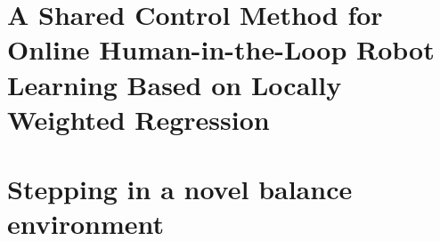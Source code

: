 \documentclass[12pt,a4paper,twoside]{report}
\begin{document}
\chapter{A Shared Control Method for Online Human-in-the-Loop Robot Learning Based on Locally Weighted Regression}\label{sec:Luka}
\setcounter{figure}{0}

\clearpage

\chapter{Stepping in a novel balance environment}\label{sec:Zrinka}
\setcounter{figure}{0}

\clearpage{}



\end{document}
